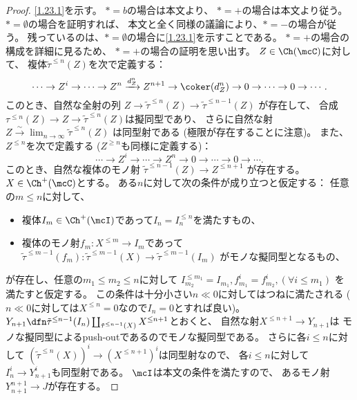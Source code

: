 \documentclass[uplatex,dvipdfmx]{jsarticle}
\begin{document}
\begin{proof}
  \ref{1.23.1}を示す。
  \(*=b\)の場合は本文\cite[Corollary 1.7.8]{kashiwara2002sheaves}より、
  \(*=+\)の場合は本文\cite[Corollary 1.7.7]{kashiwara2002sheaves}より従う。
  \(*=\emptyset\)の場合を証明すれば、
  本文\cite[Corollary 1.7.8]{kashiwara2002sheaves}と全く同様の議論により、\(*=-\)の場合が従う。
  残っているのは、\(*=\emptyset\)の場合に\ref{1.23.1}を示すことである。
  \(*=+\)の場合の構成を詳細に見るため、
  \(*=+\)の場合の証明を思い出す。
  \(Z\in \Ch(\mcC)\)に対して、
  複体\(\tilde{\tau}^{\leq n}(Z)\)を次で定義する：
  \[
  \cdots \to Z^i \to \cdots \to Z^n \xrightarrow{d_Z^n} Z^{n+1}
  \to \coker(d_Z^n) \to 0 \to \cdots \to 0 \to \cdots.
  \]
  このとき、自然な全射の列
  \(Z\to \tilde{\tau}^{\leq n}(Z)\to \tilde{\tau}^{\leq n-1}(Z)\)
  が存在して、
  合成\(\tau^{\leq n}(Z) \to Z \to \tilde{\tau}^{\leq n}(Z)\)は擬同型であり、
  さらに自然な射
  \(Z \xrightarrow{\sim} \lim_{n\to \infty}\tilde{\tau}^{\leq n}(Z)\)
  は同型射である (極限が存在することに注意)。
  また、\(Z^{\leq n}\)を次で定義する (\(Z^{\geq n}\)も同様に定義する)：
  \[
  \cdots \to Z^i \to \cdots \to Z^n \to 0 \to \cdots \to 0 \to \cdots.
  \]
  このとき、自然な複体のモノ射
  \(\tilde{\tau}^{\leq n-1}(Z) \to Z^{\leq n+1}\)
  が存在する。
  \(X\in \Ch^+(\mcC)\)とする。
  ある\(n\)に対して次の条件が成り立つと仮定する：
  任意の\(m\leq n\)に対して、
  \begin{itemize}
    \item 複体\(I_m\in \Ch^+(\mcI)\)であって\(I_n = I_n^{\leq n}\)を満たすもの、
    \item 複体のモノ射\(f_m:X^{\leq m}\to I_m\)であって
    \(\tilde{\tau}^{\leq m-1}(f_m):
    \tilde{\tau}^{\leq m-1}(X) \to \tilde{\tau}^{\leq m-1}(I_m)\)
    がモノな擬同型となるもの、
  \end{itemize}
  が存在し、任意の\(m_1\leq m_2\leq n\)に対して
  \(I_{m_2}^{\leq m_1} = I_{m_1}, f_{m_1}^i = f_{m_2}^i, (\forall i\leq m_1)\)
  を満たすと仮定する。
  この条件は十分小さい\(n\ll 0\)に対してはつねに満たされる
  (\(n\ll 0\)に対しては\(X^{\leq n} = 0\)なので\(I_n=0\)とすれば良い)。
  \(Y_{n+1} \dfn \tilde{\tau}^{\leq n-1}(I_n)
  \coprod_{\tilde{\tau}^{\leq n-1}(X)} X^{\leq n+1}\)とおくと、
  自然な射\(X^{\leq n+1}\to Y_{n+1}\)は
  モノな擬同型によるpush-outであるのでモノな擬同型である。
  さらに各\(i\leq n\)に対して
  \((\tilde{\tau}^{\leq n}(X))^i \to (X^{\leq n+1})^i\)は同型射なので、
  各\(i\leq n\)に対して\(I_n^i \to Y_{n+1}^i\)も同型射である。
  \(\mcI\)は本文の条件\cite[(1.7.5)]{kashiwara2002sheaves}を満たすので、
  あるモノ射\(Y_{n+1}^{n+1} \to J\)が存在する。

\end{proof}
\end{document}
